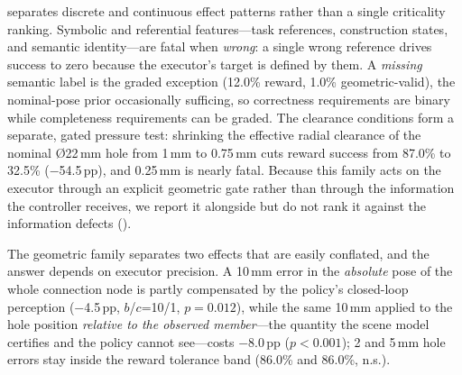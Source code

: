  separates discrete and continuous effect patterns
rather than a single criticality ranking. Symbolic and referential
features---task references, construction states, and semantic identity---are
fatal when \emph{wrong}: a single wrong reference drives success to zero
because the executor's target is defined by them. A \emph{missing} semantic
label is the graded exception (12.0\% reward, 1.0\% geometric-valid), the
nominal-pose prior occasionally sufficing, so correctness requirements are
binary while completeness requirements can be graded. The clearance
conditions form a
separate, gated pressure test: shrinking the effective radial clearance of
the nominal \O22\,mm hole from 1\,mm to 0.75\,mm cuts reward success from
87.0\% to 32.5\% ($-$54.5\,pp), and 0.25\,mm is nearly fatal. Because
this family acts on the executor through an explicit geometric gate rather
than through the information the controller receives, we report it alongside
but do not rank it against the information defects ().

The geometric family separates two effects that are easily conflated, and the
answer depends on executor precision. A 10\,mm error in the \emph{absolute}
pose of the whole connection node is partly compensated by the policy's
closed-loop perception ($-$4.5\,pp, $b$/$c$=10/1, $p=0.012$), while the same
10\,mm applied to the hole position \emph{relative to the observed
member}---the quantity the scene model certifies and the policy cannot
see---costs $-$8.0\,pp ($p<0.001$); 2 and 5\,mm hole errors stay inside the
reward tolerance band (86.0\% and 86.0\%, n.s.).

